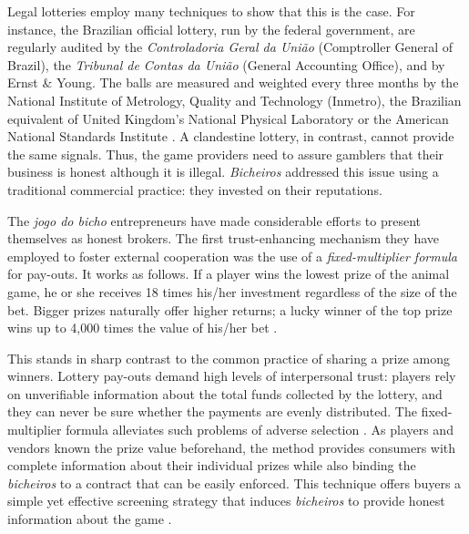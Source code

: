 \documentclass[a4paper,12pt]{article}
\begin{document}
Legal lotteries employ many techniques to show that this is the case. For instance, the Brazilian official lottery, run by the federal government, are regularly audited by the \textit{Controladoria Geral da União} (Comptroller General of Brazil), the \textit{Tribunal de Contas da União} (General Accounting Office), and by Ernst \& Young. The balls are measured and weighted every three months by the National Institute of Metrology, Quality and Technology (Inmetro), the Brazilian equivalent of United Kingdom's National Physical Laboratory or the American National Standards Institute \citep{uol2016loteria}. A clandestine lottery, in contrast, cannot provide the same signals. Thus, the game providers need to assure gamblers that their business is honest although it is illegal. \textit{Bicheiros} addressed this issue using a traditional commercial practice: they invested on their reputations.   

The \textit{jogo do bicho} entrepreneurs have made considerable efforts to present themselves as honest brokers. The first trust-enhancing mechanism they have employed to foster external cooperation was the use of a \textit{fixed-multiplier formula} for pay-outs. It works as follows. If a player wins the lowest prize of the animal game, he or she receives 18 times his/her investment regardless of the size of the bet. Bigger prizes naturally offer higher returns; a lucky winner of the top prize wins up to 4,000 times the value of his/her bet \citetext{\citealp[89]{labronici2012paratodos}; \citealp[20]{magalhaes2005ganhou}}.

This stands in sharp contrast to the common practice of sharing a prize among winners. Lottery pay-outs demand high levels of interpersonal trust: players rely on unverifiable information about the total funds collected by the lottery, and they can never be sure whether the payments are evenly distributed. The fixed-multiplier formula alleviates such problems of adverse selection \citep{akerlof1970market, cohen2010testing, levin2001information}. As players and vendors known the prize value beforehand, the method provides consumers with complete information about their individual prizes while also binding the \textit{bicheiros} to a contract that can be easily enforced. This technique offers buyers a simple yet effective screening strategy that induces \textit{bicheiros} to provide honest information about the game \citep{spence1973job, stiglitz1981credit}.
\end{document}

